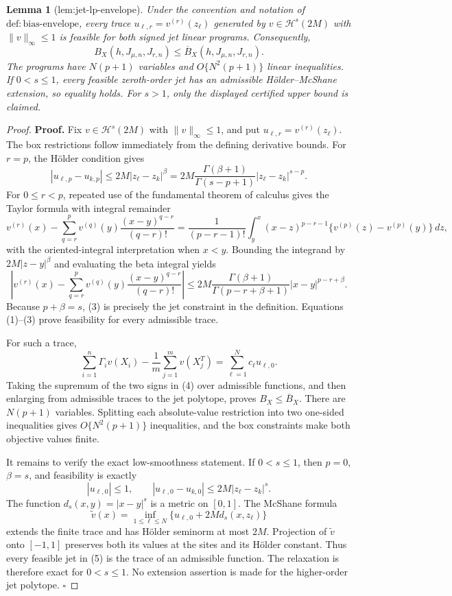 \documentclass{article}
\newtheorem{lemma}{Lemma}
\begin{document}
\begin{lemma}[lem:jet-lp-envelope]\label{lem:jet-lp-envelope}
Under the convention and notation of \(\mathrm{def:bias\text{-}envelope}\), every trace \(u_{\ell,r}=v^{(r)}(z_\ell)\) generated by \(v\in\mathcal H^s(2M)\) with \(\|v\|_\infty\le1\) is feasible for both signed jet linear programs. Consequently,
\[
B_X(h,J_{\mu,n},J_{r,n})\le\overline B_X(h,J_{\mu,n},J_{r,n}).
\]
The programs have \(N(p+1)\) variables and \(O\{N^2(p+1)\}\) linear inequalities. If \(0<s\le1\), every feasible zeroth-order jet has an admissible H\"older--McShane extension, so equality holds. For \(s>1\), only the displayed certified upper bound is claimed.
\end{lemma}
\begin{proof}
\textbf{Proof.}
Fix \(v\in\mathcal H^s(2M)\) with \(\|v\|_\infty\le1\), and put \(u_{\ell,r}=v^{(r)}(z_\ell)\). The box restrictions follow immediately from the defining derivative bounds. For \(r=p\), the H\"older condition gives
\[
|u_{\ell,p}-u_{k,p}|\le2M|z_\ell-z_k|^\beta
=2M\frac{\Gamma(\beta+1)}{\Gamma(s-p+1)}|z_\ell-z_k|^{s-p}.
\tag{1}
\]
For \(0\le r<p\), repeated use of the fundamental theorem of calculus gives the Taylor formula with integral remainder
\[
v^{(r)}(x)-\sum_{q=r}^p v^{(q)}(y)\frac{(x-y)^{q-r}}{(q-r)!}
=\frac1{(p-r-1)!}\int_y^x(x-z)^{p-r-1}\{v^{(p)}(z)-v^{(p)}(y)\}\,dz,
\tag{2}
\]
with the oriented-integral interpretation when \(x<y\). Bounding the integrand by \(2M|z-y|^\beta\) and evaluating the beta integral yields
\[
\left|v^{(r)}(x)-\sum_{q=r}^p v^{(q)}(y)\frac{(x-y)^{q-r}}{(q-r)!}\right|
\le2M\frac{\Gamma(\beta+1)}{\Gamma(p-r+\beta+1)}|x-y|^{p-r+\beta}.
\tag{3}
\]
Because \(p+\beta=s\), (3) is precisely the jet constraint in the definition. Equations (1)--(3) prove feasibility for every admissible trace.

For such a trace,
\[
\sum_{i=1}^n\Gamma_i v(X_i)-\frac1m\sum_{j=1}^mv(X_j^T)
=\sum_{\ell=1}^Nc_\ell u_{\ell,0}.
\tag{4}
\]
Taking the supremum of the two signs in (4) over admissible functions, and then enlarging from admissible traces to the jet polytope, proves \(B_X\le\overline B_X\). There are \(N(p+1)\) variables. Splitting each absolute-value restriction into two one-sided inequalities gives \(O\{N^2(p+1)\}\) inequalities, and the box constraints make both objective values finite.

It remains to verify the exact low-smoothness statement. If \(0<s\le1\), then \(p=0\), \(\beta=s\), and feasibility is exactly
\[
|u_{\ell,0}|\le1,
\qquad
|u_{\ell,0}-u_{k,0}|\le2M|z_\ell-z_k|^s.
\tag{5}
\]
The function \(d_s(x,y)=|x-y|^s\) is a metric on \([0,1]\). The McShane formula
\[
\widetilde v(x)=\inf_{1\le\ell\le N}\{u_{\ell,0}+2M d_s(x,z_\ell)\}
\tag{6}
\]
extends the finite trace and has H\"older seminorm at most \(2M\). Projection of \(\widetilde v\) onto \([-1,1]\) preserves both its values at the sites and its H\"older constant. Thus every feasible jet in (5) is the trace of an admissible function. The relaxation is therefore exact for \(0<s\le1\). No extension assertion is made for the higher-order jet polytope. \(\square\)
\end{proof}
\end{document}
